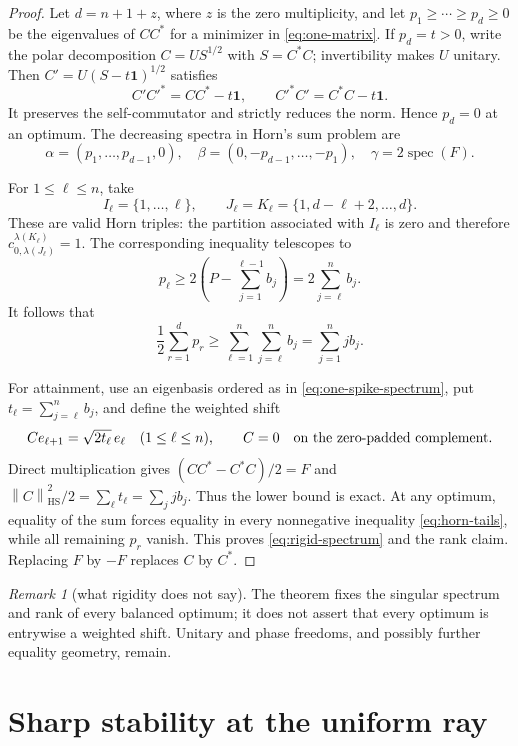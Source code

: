 \documentclass[11pt]{article}
\theoremstyle{definition}
\theoremstyle{remark}
\newtheorem{remark}[theorem]{Remark}
\newcommand{\spec}{\operatorname{spec}}
\newcommand{\1}{\mathbf 1}
\newcommand{\norm}[1]{\left\lVert#1\right\rVert}
\newcommand{\HS}{\mathrm{HS}}
\begin{document}
\begin{proof}
Let $d=n+1+z$, where $z$ is the zero multiplicity, and let
$p_1\ge\cdots\ge p_d\ge0$ be the eigenvalues of $CC^*$ for a minimizer in
\eqref{eq:one-matrix}.  If $p_d=t>0$, write the polar decomposition
$C=US^{1/2}$ with $S=C^*C$; invertibility makes $U$ unitary.  Then
$C'=U(S-t\1)^{1/2}$ satisfies
\[
 C'C'^*=CC^*-t\1,\qquad C'^*C'=C^*C-t\1.
\]
It preserves the self-commutator and strictly reduces the norm.  Hence
$p_d=0$ at an optimum.  The decreasing spectra in Horn's sum problem are
\[
 \alpha=(p_1,\ldots,p_{d-1},0),\quad
 \beta=(0,-p_{d-1},\ldots,-p_1),\quad
 \gamma=2\spec(F).
\]

For $1\le\ell\le n$, take
\[
 I_\ell=\{1,\ldots,\ell\},\qquad
 J_\ell=K_\ell=\{1,d-\ell+2,\ldots,d\}.
\]
These are valid Horn triples: the partition associated with $I_\ell$ is
zero and therefore
$c_{0,\lambda(J_\ell)}^{\lambda(K_\ell)}=1$.  The corresponding inequality
telescopes to
\begin{equation}
 p_\ell\ge 2\left(P-\sum_{j=1}^{\ell-1}b_j\right)
 =2\sum_{j=\ell}^n b_j.
 \label{eq:horn-tails}
\end{equation}
It follows that
\[
 \frac12\sum_{r=1}^d p_r
 \ge\sum_{\ell=1}^n\sum_{j=\ell}^n b_j
 =\sum_{j=1}^n j b_j.
\]

For attainment, use an eigenbasis ordered as in
\eqref{eq:one-spike-spectrum}, put
$t_\ell=\sum_{j=\ell}^n b_j$, and define the weighted shift
\begin{equation}
 Ce_{\ell+1}=\sqrt{2t_\ell}\,e_\ell
 \quad(1\le\ell\le n),
 \qquad C=0\quad\hbox{on the zero-padded complement}.
 \label{eq:weighted-shift}
\end{equation}
Direct multiplication gives
$(CC^*-C^*C)/2=F$ and
$\norm C_{\HS}^2/2=\sum_\ell t_\ell=\sum_j j b_j$.
Thus the lower bound is exact.  At any optimum, equality of the sum forces
equality in every nonnegative inequality \eqref{eq:horn-tails}, while all
remaining $p_r$ vanish.  This proves \eqref{eq:rigid-spectrum} and the rank
claim.  Replacing $F$ by $-F$ replaces $C$ by $C^*$.
\end{proof}

\begin{remark}[what rigidity does not say]
The theorem fixes the singular spectrum and rank of every balanced optimum;
it does not assert that every optimum is entrywise a weighted shift.  Unitary
and phase freedoms, and possibly further equality geometry, remain.
\end{remark}

\section{Sharp stability at the uniform ray}
\end{document}
